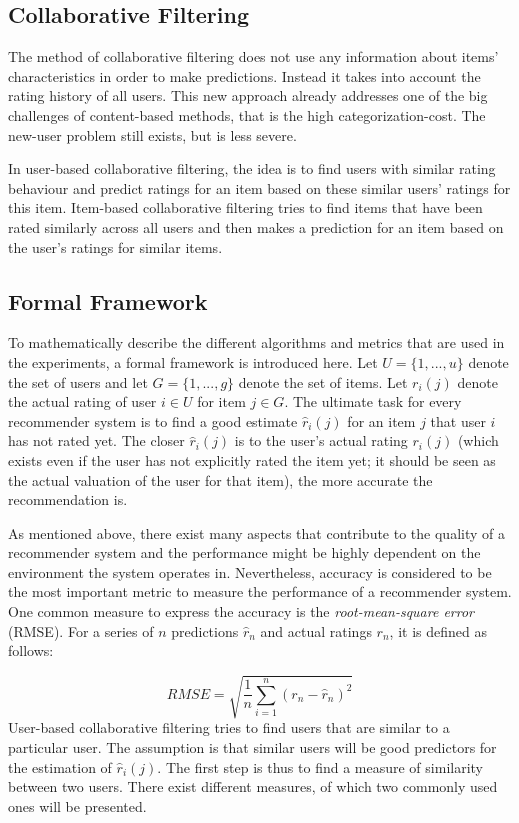 \subsection{Collaborative Filtering}
\label{sst:collaborativefiltering} The method of collaborative filtering does not use any information about items' characteristics in order to make predictions. Instead it takes into account the rating history of all users. This new approach already addresses one of the big challenges of content-based methods, that is the high categorization-cost. The new-user problem still exists, but is less severe.

In user-based collaborative filtering, the idea is to find users with similar rating behaviour and predict ratings for an item based on these similar users' ratings for this item. Item-based collaborative filtering tries to find items that have been rated similarly across all users and then makes a prediction for an item based on the user's ratings for similar items.

\subsection{Formal Framework}
\label{ssst:formalframework} To mathematically describe the different algorithms and metrics that are used in the experiments, a formal framework is introduced here. Let $U = \{1,...,u\}$ denote the set of users and let $G = \{1,...,g\}$ denote the set of items. Let $r_i(j)$ denote the actual rating of user $i \in U$ for item $j \in G$. The ultimate task for every recommender system is to find a good estimate $\hat{r}_i(j)$ for an item $j$ that user $i$ has not rated yet. The closer $\hat{r}_i(j)$ is to the user's actual rating $r_i(j)$ (which exists even if the user has not explicitly rated the item yet; it should be seen as the actual valuation of the user for that item), the more accurate the recommendation is.

As mentioned above, there exist many aspects that contribute to the quality of a recommender system and the performance might be highly dependent on the environment the system operates in. Nevertheless, accuracy is considered to be the most important metric to measure the performance of a recommender system. One common measure to express the accuracy is the \textit{root-mean-square error} (RMSE). For a series of $n$ predictions $\hat{r}_n$ and actual ratings $r_n$, it is defined as follows:

\begin{equation}
RMSE = \sqrt{\frac{1}{n} \sum_{i=1}^{n}(r_n - \hat{r}_n)^2}
\label{eq:rmse}
\end{equation}
\newline
\newline
User-based collaborative filtering tries to find users that are similar to a particular user. The assumption is that similar users will be good predictors for the estimation of $\hat{r}_i(j)$. The first step is thus to find a measure of similarity between two users. There exist different measures, of which two commonly used ones will be presented.

